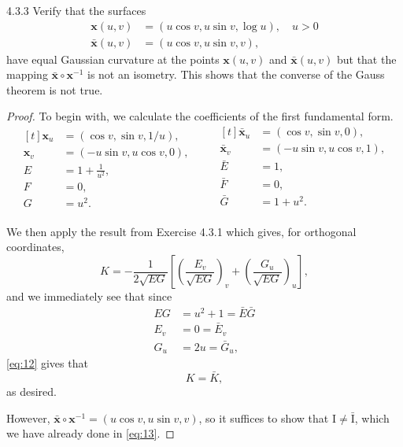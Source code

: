 \documentclass[11pt]{article}
\begin{document}
\begin{problem}{4.3.3}
  Verify that the surfaces
  \begin{equation}
  \label{eq:2}
  \begin{aligned}
    \mathbf{x}(u,v) &= (u\cos v, u\sin v, \log u), \quad u > 0 \\
    \mathbf{\bar{x}}(u,v) &= (u\cos v, u \sin v, v),
  \end{aligned}
\end{equation}
have equal Gaussian curvature at the points \( \mathbf{x}(u,v) \) and \( \mathbf{\bar{x}}(u,v) \) but that the mapping \( \mathbf{\bar{x}} \circ \mathbf{x}^{-1} \) is not an isometry.
This shows that the converse of the Gauss theorem is not true.
\end{problem}
\begin{proof}
  To begin with, we calculate the coefficients of the first fundamental form.
  \begin{equation}
  \label{eq:11}
  \begin{aligned}[t]
    \mathbf{x}_u &= (\cos v, \sin v, 1/u), \\
    \mathbf{x}_v &= (-u\sin v, u\cos v, 0), \\
    E &= 1 + \frac{1}{u^2}, \\
    F &= 0, \\
    G &= u^2.
  \end{aligned}
  \qquad
  \begin{aligned}[t]
    \mathbf{\bar{x}}_u &= (\cos v, \sin v, 0), \\
    \mathbf{\bar{x}}_v &= (-u\sin v, u\cos v, 1), \\
    \bar{E} &= 1, \\
    \bar{F} &= 0, \\
    \bar{G} &= 1 + u^2.\\
  \end{aligned}
  \end{equation}

  We then apply the result from Exercise 4.3.1 which gives, for orthogonal coordinates,
  \begin{equation}
  \label{eq:12}
  K = - \frac{1}{2 \sqrt{EG}} \left[ \left( \frac{E_v}{\sqrt{EG}} \right)_v + \left( \frac{G_u}{\sqrt{EG}} \right)_{u} \right],
\end{equation}
and we immediately see that since
\begin{equation}
\label{eq:13}
\begin{aligned}
  EG &= u^2 + 1 = \bar{E}\bar{G} \\
  E_v &= 0 = \bar{E}_v \\
  G_u &= 2u = \bar{G}_u,
\end{aligned}
\end{equation}
\cref{eq:12} gives that
\begin{equation}
\label{eq:14}
K = \bar{K},
\end{equation}
as desired.

However, \( \mathbf{\bar{x}} \circ \mathbf{x}^{-1} = (u\cos v, u\sin v, v) \), so it suffices to show that \( \mathrm{I} \neq \bar{\mathrm{I}} \), which we have already done in \cref{eq:13}.
\end{proof}
\end{document}
